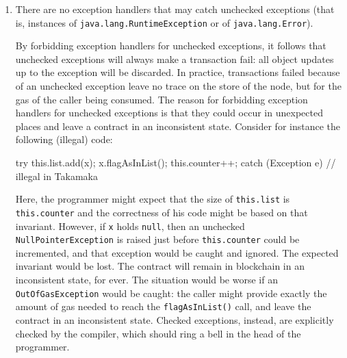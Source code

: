 \begin{enumerate}
\begin{commentbox}
checking properties such as point~\ref{check:caller_correct_usage} above.
\end{commentbox}
%
\item\label{check:no_unchecked_exception_handlers}
	There are no exception handlers that may catch unchecked exceptions (that is,
 	instances of \texttt{java.lang.RuntimeException} or of \texttt{java.lang.Error}).
%
\begin{commentbox}
By forbidding exception handlers for unchecked exceptions, it follows that
unchecked exceptions will always make a transaction fail: all object
updates up to the exception will be discarded. In practice,
transactions failed because of an unchecked exception leave no trace on
the store of the node, but for the gas of the caller being consumed. The reason for
forbidding exception handlers for unchecked exceptions is that they could
occur in unexpected places and leave a contract in an inconsistent state.
Consider for instance the following (illegal) code:
%
\begin{codebox}\begin{javalst}
try {
  this.list.add(x);
  x.flagAsInList();
  this.counter++;
}
catch (Exception e) { // illegal in Takamaka
}
\end{javalst}\end{codebox}
%
Here, the programmer might expect that
the size of \texttt{this.list} is \texttt{this.counter} and the correctness of his code might
be based on that invariant. However, if \texttt{x} holds
\texttt{null}, then an unchecked \texttt{NullPointerException} is raised just before
\texttt{this.counter} could be incremented, and that exception would be caught and ignored.
The expected invariant would be lost.
The contract will remain in blockchain in an inconsistent state,
for ever. The situation would be worse if an
\texttt{OutOfGasException} would
be caught: the caller might provide exactly the amount of gas needed to
reach the \texttt{flagAsInList()} call, and leave the contract in an inconsistent
state. Checked exceptions, instead, are explicitly checked by the
compiler, which should ring a bell in the head of the programmer.


\end{commentbox}
\end{enumerate}
